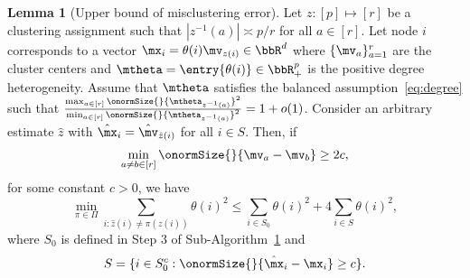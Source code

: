 \documentclass[lettersize,onecolumn,journal]{IEEEtran}
\theoremstyle{definition}
\newtheorem{lem}{Lemma}
\theoremstyle{definition}
\begin{document}
\begin{lem}[Upper bound of misclustering error]\label{lem:upper_mis} Let $z: [p] \mapsto [r]$ be a clustering assignment such that $|z^{-1}(a)| \asymp p/r$ for all $a \in [r]$. Let node $i$ corresponds to a vector $\mx_i  = \theta(i) \mv_{z(i)} \in \bbR^d$ where $\{\mv_a\}_{a = 1}^r$ are the cluster centers and $\mtheta = \entry{\theta(i)} \in \bbR^p_+$ is the positive degree heterogeneity. Assume that  $\mtheta$ satisfies the balanced assumption~\eqref{eq:degree} such that ${\max_{a \in [r]} \onormSize{}{\mtheta_{z^{-1}(a)}}^2 \over \min_{a \in [r]} \onormSize{}{\mtheta_{z^{-1}(a)}}^2 }= 1 + o(1)$. Consider an arbitrary estimate $\hat z$ with $\hat \mx_i = \hat \mv_{\hat z(i)}$ for all $ i \in S$. Then, if
\begin{equation}
    \min_{a \neq b \in [r]} \onormSize{}{\mv_a - \mv_b} \geq 2c,
\end{equation}
 for some constant $c >0$, we have 
\begin{equation}
    \min_{\pi \in \Pi} \sum_{i : \hat z(i) \neq \pi(z(i))} \theta(i)^2 \leq \sum_{i \in S_0} \theta(i)^2 + 4 \sum_{i \in S} \theta(i)^2,
\end{equation}
where $S_0$ is defined in Step 3 of Sub-Algorithm~\hyperref[alg:main]{1} and
\begin{equation}
   S = \{i \in S_0^c: \onormSize{}{\hat \mx_i - \mx_i } \geq c \}.
\end{equation}

\end{lem}
\end{document}
